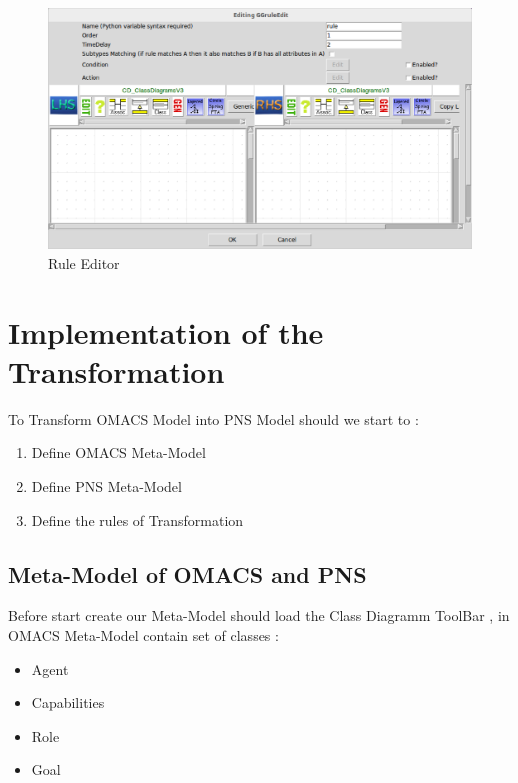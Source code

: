 \begin{figure}[th]
	\centering
 	\includegraphics[scale=0.4]{chapiter3/img/rule}
	\caption{\label{fig:Rule Editor}Rule Editor}
\end{figure} 
 


 

\section{Implementation of the Transformation }%
To Transform OMACS Model into PNS Model should we start to :
\begin{enumerate}
\item Define OMACS Meta-Model 
\item Define PNS Meta-Model
\item Define the rules of Transformation
\end{enumerate}


\subsection{ Meta-Model of OMACS  and PNS } 
Before start create our Meta-Model should load the Class Diagramm ToolBar ,
in OMACS Meta-Model contain set of classes :

\begin{itemize}

\item Agent  
\item Capabilities
\item Role
\item Goal

\end{itemize}
 
